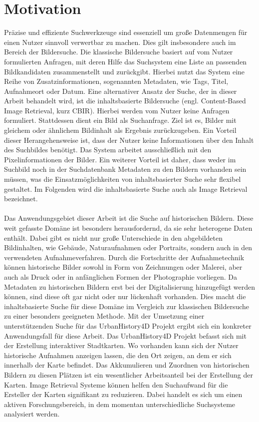 \chapter{Motivation}
Präzise und effiziente Suchwerkzeuge sind essenziell um große Datenmengen für einen Nutzer sinnvoll verwertbar zu machen. Dies gilt insbesondere auch im Bereich der Bildersuche. Die klassische Bildersuche basiert auf vom Nutzer formulierten Anfragen, mit deren Hilfe das Suchsystem eine Liste an passenden Bildkandidaten zusammenstellt und zurückgibt. Hierbei nutzt das System eine Reihe von Zusatzinformationen, sogenannten Metadaten, wie Tags, Titel, Aufnahmeort oder Datum. Eine alternativer Ansatz der Suche, der in dieser Arbeit behandelt wird, ist die inhaltsbasierte Bildersuche (engl. Content-Based Image Retrieval, kurz CBIR). Hierbei werden vom Nutzer keine Anfragen formuliert. Stattdessen dient ein Bild als Suchanfrage. Ziel ist es, Bilder mit gleichem oder ähnlichem Bildinhalt als Ergebnis zurückzugeben. Ein Vorteil dieser Herangehensweise ist, dass der Nutzer keine Informationen über den Inhalt des Suchbildes benötigt. Das System arbeitet ausschließlich mit den Pixelinformationen der Bilder. Ein weiterer Vorteil ist daher, dass weder im Suchbild noch in der Suchdatenbank Metadaten zu den Bildern vorhanden sein müssen, was die Einsatzmöglichkeiten von inhaltsbasierter Suche sehr flexibel gestaltet. Im Folgenden wird die inhaltsbasierte Suche auch als Image Retrieval bezeichnet.
\\\\
Das Anwendungsgebiet dieser Arbeit ist die Suche auf historischen Bildern. Diese weit gefasste Domäne ist besonders herausfordernd, da sie sehr heterogene Daten enthält. Dabei gibt es nicht nur große Unterschiede in den abgebildeten Bildinhalten, wie Gebäude, Naturaufnahmen oder Portraits, sondern auch in den verwendeten Aufnahmeverfahren. Durch die Fortschritte der Aufnahmetechnik können historische Bilder sowohl in Form von Zeichnungen oder Malerei, aber auch als Druck oder in anfänglichen Formen der Photographie vorliegen. Da Metadaten zu historischen Bildern erst bei der Digitalisierung hinzugefügt werden können, sind diese oft gar nicht oder nur lückenhaft vorhanden. Dies macht die inhaltsbasierte Suche für diese Domäne im Vergleich zur klassischen Bildersuche zu einer besonders geeigneten Methode. Mit der Umsetzung einer unterstützenden Suche für das UrbanHistory4D Projekt \cite{urbanhistory4d} ergibt sich ein konkreter Anwendungsfall für diese Arbeit. Das UrbanHistory4D Projekt befasst sich mit der Erstellung interaktiver Stadtkarten. Wo vorhanden kann sich der Nutzer historische Aufnahmen anzeigen lassen, die den Ort zeigen, an dem er sich innerhalb der Karte befindet. Das Akkumulieren und Zuordnen von historischen Bildern zu diesen Plätzen ist ein wesentlicher Arbeitsanteil bei der Erstellung der Karten. Image Retrieval Systeme können helfen den Suchaufwand für die Ersteller der Karten signifikant zu reduzieren. Dabei handelt es sich um einen aktiven Forschungsbereich, in dem momentan unterschiedliche Suchsysteme analysiert werden. 
